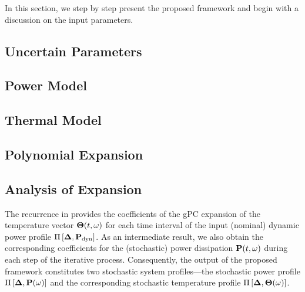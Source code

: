 In this section, we step by step present the proposed framework and begin with a discussion on the input parameters.

\subsection{Uncertain Parameters} 


\subsection{Power Model} 


\subsection{Thermal Model} 


\subsection{Polynomial Expansion} 


\subsection{Analysis of Expansion}
The recurrence in  provides the coefficients of the gPC expansion of the temperature vector ${\boldsymbol\Theta}(t, \omega)$ for each time interval of the input (nominal) dynamic power profile $\prof{\mP_\dyn}$. As an intermediate result, we also obtain the corresponding coefficients for the (stochastic) power dissipation $\mathbf{P}(t, \omega)$ during each step of the iterative process. Consequently, the output of the proposed framework constitutes two stochastic system profiles---the stochastic power profile $\prof{\mP(\o)}$ and the corresponding stochastic temperature profile $\Pi\left[\boldsymbol{\Delta}, {\boldsymbol\Theta}(\omega)\right]$.

